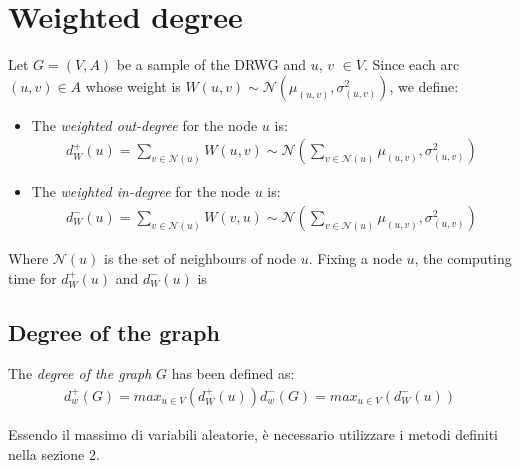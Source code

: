 \section{Weighted degree}
Let $G=(V,A)$ be a sample of the DRWG and $u$, $v$ $\in V$. Since each arc $(u,v)\in A$ whose weight is $ W(u, v) \sim \mathcal{N}(\mu_{(u, v)}, \sigma^2_{(u, v)}) $, we define:
\begin{itemize}
	\item The \textit{weighted out-degree} for the node $u$ is:
	\begin{align*}
		d_W^+(u) = \sum_{v \in \mathcal{N}(u)} W(u, v) \sim \mathcal{N}(\sum_{v \in \mathcal{N}(u)} \mu_{(u, v)}, \sigma^2_{(u, v)})
	\end{align*}
	\item The \textit{weighted in-degree} for the node $u$ is:
	\begin{align*}
		d_W^-(u) = \sum_{v \in \mathcal{N}(u)} W(v, u) \sim \mathcal{N}(\sum_{v \in \mathcal{N}(u)} \mu_{(u, v)}, \sigma^2_{(u, v)})
	\end{align*}
\end{itemize}

Where $\mathcal{N}(u)$ is the set of neighbours of node $u$.
Fixing a node $u$, the computing time for $d_W^+(u)$ and $d_W^-(u)$ is 

\subsection{Degree of the graph}
The \textit{degree of the graph} $G$ has been defined as:
\begin{align*}
	d^+_w(G) = max_{u\in V}(d_W^+(u))
	d^-_w(G) = max_{u\in V}(d_W^-(u))
\end{align*}

Essendo il massimo di variabili aleatorie, è necessario utilizzare i metodi definiti nella sezione 2.



